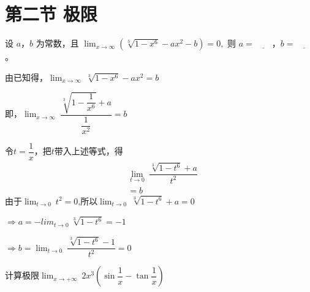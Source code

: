 \section{第二节 极限}

\begin{Problem}
    设 \(a\)，\(b\) 为常数，且
    \(
    \lim_{x \to \infty} \left( \sqrt[3]{1 - x^6} - a x^2 - b \right) = 0,
    \)
    则 \(a = \underline{\quad\quad}\)，\(b = \underline{\quad\quad}\)。
\end{Problem}
\begin{Answer}
    由已知得，$\lim_{x \to \infty}\ \sqrt[3]{1-x^6} - ax^2 = b$\par
    即，$\lim_{x \to \infty}\ \dfrac{\sqrt[3]{1-\dfrac{1}{x^6}}+a}{\dfrac{1}{x^2}} = b$\par
    令$t = \dfrac{1}{x}$，把$t$带入上述等式，得\[\begin{aligned}
        &\lim_{t \to 0}\ \dfrac{\sqrt[3]{1-t^6}+a}{t^2}\\
        &=b
    \end{aligned}\]
    由于$\lim_{t \to 0}\ t^2 = 0$,所以$\lim_{t\to 0}\ \sqrt[3]{1-t^6}+a = 0$\par
    $\Rightarrow a = -lim_{t \to 0}\ \sqrt[3]{1-t^6} = -1$\par
    $\Rightarrow b = \lim_{t \to 0}\ \dfrac{\sqrt[3]{1-t^6}-1}{t^2} =0$
\end{Answer}
\begin{Problem}
    计算极限$\lim_{x \to +\infty}\ 2x^3\left(\sin \dfrac{1}{x} - \tan \dfrac{1}{x}\right)$
\end{Problem}
